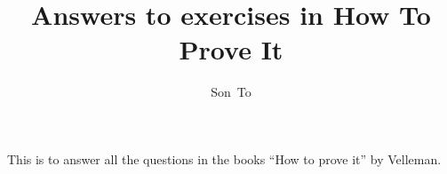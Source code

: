 \documentclass[a4paper,11pt]{memoir}
\author{Son~To}
\affil{StaffPoint Oy}
\title{Answers to exercises in How To Prove It}
\begin{document}
  \maketitle
  This is to answer all the questions in the books ``How to prove it'' by Velleman.
\end{document}
